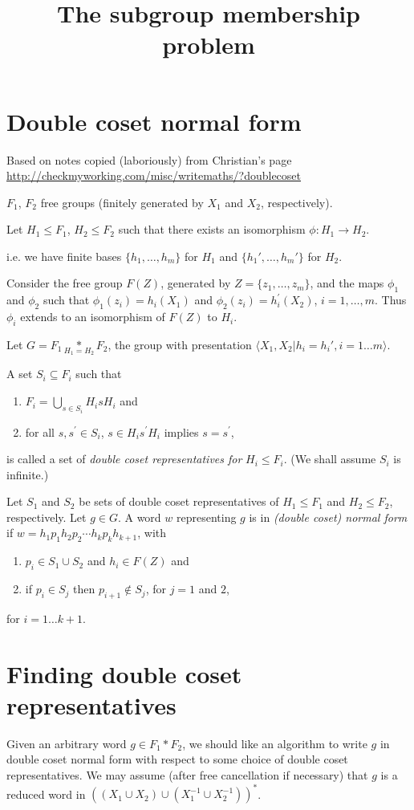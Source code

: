 \documentclass[a4paper,12pt]{article}
\title{The subgroup membership problem
}
\author{ 
}
\numberwithin{equation}{section}
\numberwithin{figure}{section}
\newcommand{\la}{\langle}
\newcommand{\ra}{\rangle}
\newcommand{\be}{\begin{enumerate}}
\newcommand{\ee}{\end{enumerate}}
\begin{document}
\maketitle
\section{Double coset normal form}
Based on notes copied (laboriously) from Christian's page 
\url{
http://checkmyworking.com/misc/writemaths/?doublecoset
}

$F_1$, $F_2$ free groups (finitely generated by $X_1$ 
and $X_2$, respectively).

Let $H_1 \leq F_1$, $H_2 \leq F_2$ such that 
there exists an isomorphism $\phi: H_1 \rightarrow H_2$.

i.e. we have finite bases $\{h_1, \ldots, h_m \}$  for $H_1$ and 
$\{h_1', \ldots, h_m'\}$ for $H_2$.

Consider the free group $F(Z)$, generated by $Z=\{z_1, \ldots, z_m\}$, 
and the maps $\phi_1$ and $\phi_2$ such that 
$\phi_1(z_i)=h_i(X_1)  $ and  $\phi_2(z_i)=h^\prime_i(X_2)$, $i=1,\ldots ,m$.
Thus $\phi_i$ extends to an isomorphism of $F(Z)$ to $H_i$. 

Let ${G = F_1 \underset{H_1=H_2}{\ast} F_2}$, the group with  
 presentation $\la X_1,X_2 | h_i = h_i', i=1 \ldots m\ra$.

A  set $S_i \subseteq F_i$ such that
\be 
\item
$F_i = \displaystyle{\bigcup_{s \in S_i} H_isH_i}$ 
and 
\item
for all $s, s^\prime \in S_i$, $s\in H_i s^\prime H_i$ 
implies $s=s^\prime$,
\ee
is called a set of \emph{double coset representatives for} $H_i\le F_i$. 
(We shall assume $S_i$ is infinite.) 

Let $S_1$ and $S_2$ be sets of  double coset representatives of 
$H_1\le F_1$ and $H_2\le F_2$, respectively. Let $g \in G$. 
A word $w$ representing $g$ is in \emph{(double coset) normal form} if 
$w = h_{1}p_1h_{2}p_2 \cdots h_{k}p_kh_{{k+1}}$, with
\be
\item $p_i \in S_1\cup S_2$  and $h_i \in F(Z)$ and
\item if $p_i\in S_j$ then $p_{i+1}\notin S_j$, for $j=1$ and $2$,
\ee
for $i = 1 \ldots k+1$.
\section{Finding double coset representatives}

Given an arbitrary word $g\in F_1\ast F_2$,  
we should like an algorithm to write $g$ in double coset normal form
with respect to some choice of double coset representatives. We may 
assume (after free cancellation if necessary) that $g$ is a 
reduced word in $((X_1\cup X_2)\cup ( X_1^{-1}\cup X_2^{-1}))^\ast$.
 
\end{document}
